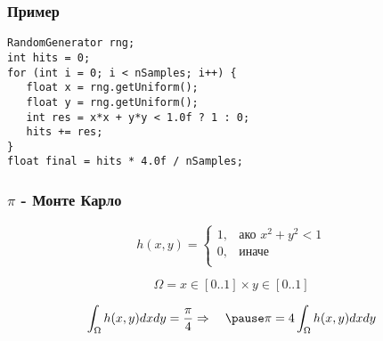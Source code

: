 \begin{frame}[fragile]
\frametitle{Пример}
\pause
\begin{lstlisting}
RandomGenerator rng;
int hits = 0;
for (int i = 0; i < nSamples; i++) {
   float x = rng.getUniform();
   float y = rng.getUniform();
   int res = x*x + y*y < 1.0f ? 1 : 0;
   hits += res;
}
float final = hits * 4.0f / nSamples;
\end{lstlisting}
\end{frame}


\begin{frame}
  \frametitle{$\pi$ - Монте Карло}
  \begin{equation*}
   h(x,y) = \begin{cases}
        1,& \text{ако } x^2 + y^2 < 1 \\
        0,& \text{иначе}\\
        \end{cases}
  \end{equation*}
  \pause

  \begin{equation*}
    \Omega = x \in [0 .. 1] \times y \in [0 .. 1]
  \end{equation*}
  \pause

  \begin{equation*}
   \int_{\Omega} h(x,y) dx dy = \frac{\pi}{4} \Rightarrow \quad 
  \pause
   \pi = 4 \int_{\Omega} h(x,y) dx dy
  \end{equation*}
\end{frame}
